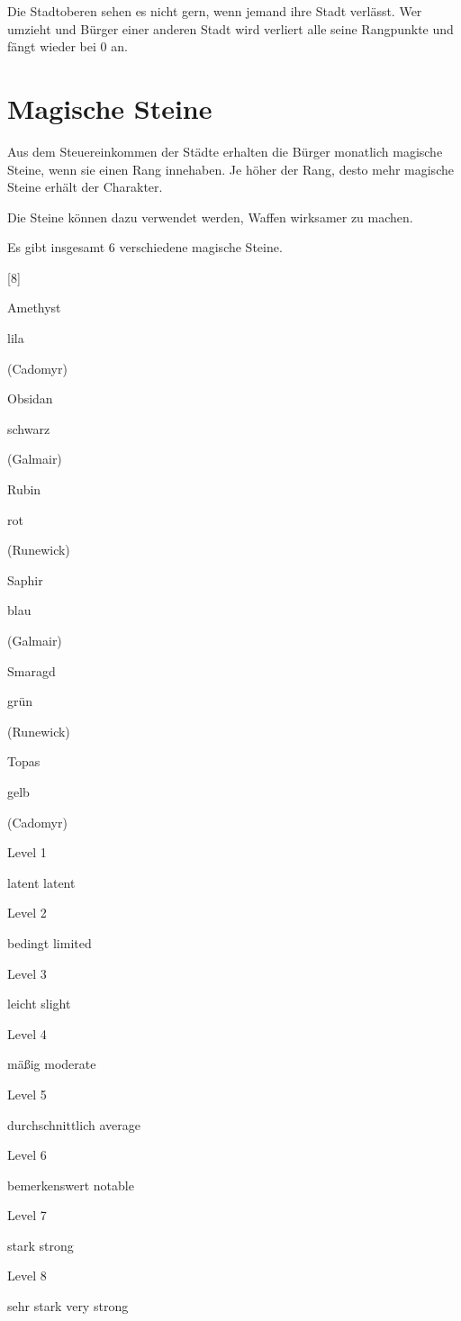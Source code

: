 \documentclass[a4paper,11pt]{book}
\begin{document}
Die Stadtoberen sehen es nicht gern, wenn jemand ihre Stadt verlässt. Wer umzieht und Bürger einer anderen Stadt wird verliert alle seine Rangpunkte und fängt wieder bei 0 an.

\section{Magische Steine}

Aus dem Steuereinkommen der Städte erhalten die Bürger monatlich magische Steine, wenn sie einen Rang innehaben. Je höher der Rang, desto mehr magische Steine erhält der Charakter.

Die Steine können dazu verwendet werden, Waffen wirksamer zu machen.

Es gibt insgesamt 6 verschiedene magische Steine.

[8]

Amethyst

lila

(Cadomyr)

Obsidan

schwarz

(Galmair)

Rubin

rot

(Runewick)

Saphir

blau

(Galmair)

Smaragd

grün

(Runewick)

Topas

gelb

(Cadomyr)

Level 1

latent  latent

Level 2

bedingt  limited

Level 3

leicht  slight

Level 4

mäßig  moderate

Level 5

durchschnittlich average

Level 6

bemerkenswert notable

Level 7

stark  strong

Level 8

sehr stark  very strong
\end{document}
